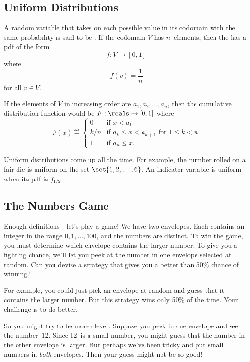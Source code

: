 \subsection{Uniform Distributions}\label{sec:uniform_dist}

A random variable that takes on each possible value in its codomain
with the same probability is said to be .  If the
codomain $V$ has $n$~elements, then the  has a pdf of the form
\begin{equation*}
    f: V \to [0, 1]
\end{equation*}
where
\[
    f(v) = \frac{1}{n}
\]
for all $v \in V$.  

If the elements of $V$ in increasing order are $a_1, a_2, \dots,
a_n$, then the cumulative distribution function would be $F: \reals
  \to [0, 1]$ where
\[
F(x) \eqdef
    \begin{cases}
        0 & \text{if $x < a_1$} \\
        k/n & \text{if $a_k \le x < a_{k + 1}$ for $1 \le k < n$} \\
        1 & \text{if $a_n \le x$}.
    \end{cases}
\]

Uniform distributions come up all the time.  For example, the number
rolled on a fair die is uniform on the set $\set{1, 2, \dots, 6}$.  An
indicator variable is uniform when its pdf is $f_{1/2}$.

\subsection{The Numbers Game}\label{bigger_number_subsec}

Enough definitions---let's play a game!  We have two envelopes.  Each
contains an integer in the range $0, 1, \dots, 100$, and the numbers
are distinct.  To win the game, you must determine which envelope
contains the larger number.  To give you a fighting chance, we'll let
you peek at the number in one envelope selected at random.  Can you
devise a strategy that gives you a better than 50\% chance of winning?

For example, you could just pick an envelope at random and guess that
it contains the larger number.  But this strategy wins only 50\% of
the time.  Your challenge is to do better.

So you might try to be more clever.  Suppose you peek in one envelope
and see the number~12.  Since 12~is a small number, you might guess
that the number in the other envelope is larger.  But perhaps we've
been tricky and put small numbers in \textit{both} envelopes.  Then
your guess might not be so good!

